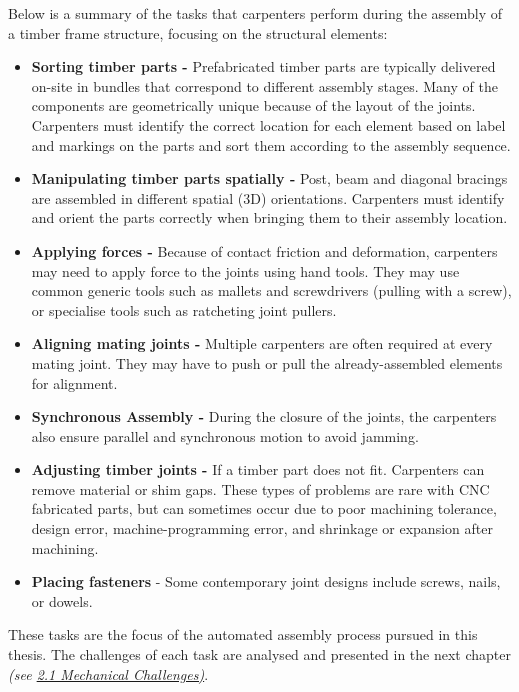 \documentclass[11pt]{book}
\begin{document}
Below is a summary of the tasks that carpenters perform during the assembly of a timber frame structure, focusing on the structural elements:

\begin{itemize}
	\item \textbf{Sorting timber parts - }Prefabricated timber parts are typically delivered on-site in bundles that correspond to different assembly stages. Many of the components are geometrically unique because of the layout of the joints. Carpenters must identify the correct location for each element based on label and markings on the parts and sort them according to the assembly sequence.

	\item \textbf{Manipulating timber parts spatially - }Post, beam and diagonal bracings are assembled in different spatial (3D) orientations. Carpenters must identify and orient the parts correctly when bringing them to their assembly location.

	\item \textbf{Applying forces - }Because of contact friction and deformation, carpenters may need to apply force to the joints using hand tools. They may use common generic tools such as mallets and screwdrivers (pulling with a screw), or specialise tools such as ratcheting joint pullers. 

	\item \textbf{Aligning mating joints -} Multiple carpenters are often required at every mating joint. They may have to push or pull the already-assembled elements for alignment. 

	\item \textbf{Synchronous Assembly - }During the closure of the joints, the carpenters also ensure parallel and synchronous motion to avoid jamming.

	\item \textbf{Adjusting timber joints - }If a timber part does not fit. Carpenters can remove material or shim gaps. These types of problems are rare with CNC fabricated parts, but can sometimes occur due to poor machining tolerance, design error, machine-programming error, and shrinkage or expansion after machining.

	\item \textbf{Placing fasteners} - Some contemporary joint designs include screws, nails, or dowels.

\end{itemize}
These tasks are the focus of the automated assembly process pursued in this thesis. The challenges of each task are analysed and presented in the next chapter \textit{(see \uline{2.1 Mechanical Challenges)}}.
\end{document}
